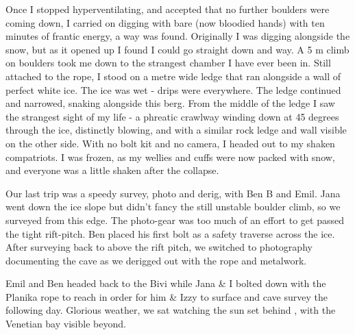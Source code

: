 Once I stopped hyperventilating, and accepted that no further boulders
were coming down, I carried on digging with bare (now bloodied hands)
with ten minutes of frantic energy, a way was found. Originally I was
digging alongside the snow, but as it opened up I found I could go
straight down and way. A 5 m climb on boulders took me down to the
strangest chamber I have ever been in. Still attached to the rope, I
stood on a metre wide ledge that ran alongside a wall of perfect white
ice. The ice was wet - drips were everywhere. The ledge continued and
narrowed, snaking alongside this berg. From the middle of the ledge I
saw the strangest sight of my life - a phreatic crawlway winding down at
45 degrees through the ice, distinctly blowing, and with a similar rock
ledge and wall visible on the other side. With no bolt kit and no
camera, I headed out to my shaken compatriots. I was frozen, as my
wellies and cuffs were now packed with snow, and everyone was a little
shaken after the collapse.


Our last trip was a speedy survey, photo and derig, with Ben B and Emil.
Jana went down the ice slope but didn't fancy the still unstable boulder
climb, so we surveyed from this edge. The photo-gear was too much of an
effort to get passed the tight rift-pitch. Ben placed his first bolt as
a safety traverse across the ice. After surveying back to above the rift
pitch, we switched to photography documenting the cave as we derigged
out with the rope and metalwork.

Emil and Ben headed back to the Bivi while Jana \& I bolted down with
the Planika rope to reach  in order for him \& Izzy to surface
and cave survey the following day. Glorious weather, we sat watching the
sun set behind , with the Venetian bay visible beyond.


